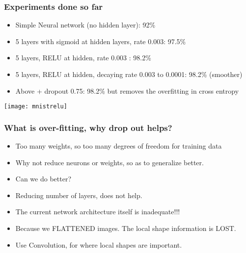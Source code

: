 \begin{frame}[fragile] \frametitle{Experiments done so far}

\begin{itemize}
\item Simple Neural network (no hidden layer): 92\%
\item 5 layers with sigmoid at hidden layers, rate 0.003: 97.5\%
\item 5 layers, RELU at hidden, rate 0.003 : 98.2\%
\item 5 layers, RELU at hidden, decaying rate 0.003 to 0.0001: 98.2\% (smoother)
\item Above + dropout 0.75: 98.2\% but removes the overfitting in cross entropy
\end{itemize}
\begin{center}
\texttt{[image: mnistrelu]}
\end{center}
\end{frame}

\begin{frame}[fragile] \frametitle{What is over-fitting, why drop out helps?}
\begin{itemize}
\item Too many weights, so too many degrees of freedom for training data
\item Why not reduce neurons or weights, so as to generalize better.
\item Can we do better? 
\item Reducing number of layers, does not help.
\item The current network architecture itself is inadequate!!!
\item Because we FLATTENED images. The local shape information is LOST.
\item Use Convolution, for where local shapes are important.
\end{itemize}
\end{frame}